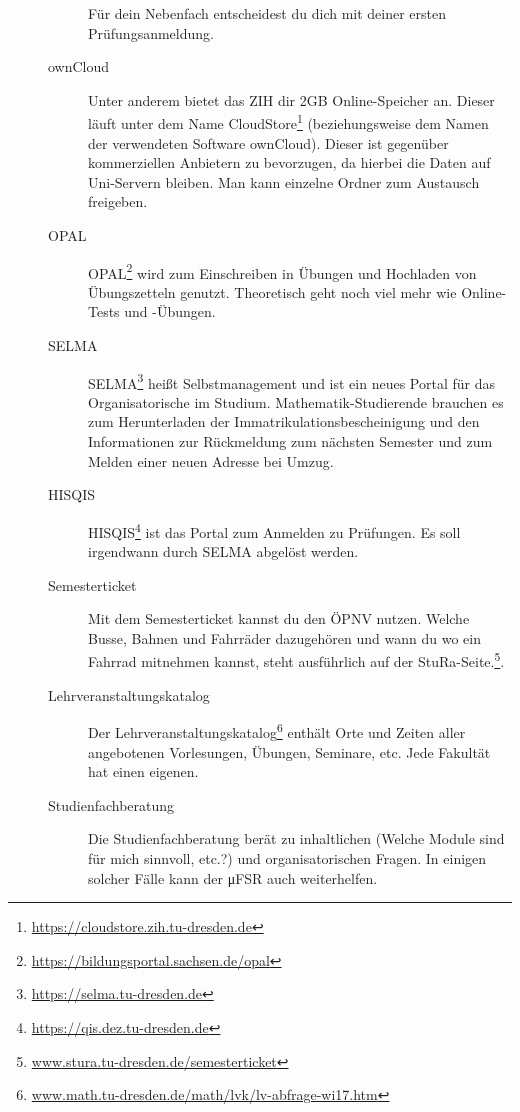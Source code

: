 \documentclass{scrartcl}
\begin{document}
\begin{description}
\begin{description}
    Für dein Nebenfach entscheidest du dich mit deiner ersten
    Prüfungsanmeldung.
  \item[ownCloud] Unter anderem bietet das ZIH dir 2GB Online-Speicher an.
    Dieser läuft unter dem Name CloudStore\footnote{\url{https://cloudstore.zih.tu-dresden.de}} (beziehungsweise dem Namen der verwendeten Software ownCloud).
    Dieser ist gegenüber kommerziellen Anbietern zu bevorzugen,
    da hierbei die Daten auf Uni-Servern bleiben. Man kann einzelne Ordner zum Austausch freigeben.
  \item[OPAL] OPAL\footnote{\url{https://bildungsportal.sachsen.de/opal}} wird zum Einschreiben in Übungen und Hochladen von Übungszetteln genutzt. Theoretisch geht noch viel mehr
    wie Online-Tests und -Übungen.
  \item[SELMA] SELMA\footnote{\url{https://selma.tu-dresden.de}} heißt Selbstmanagement und ist ein neues Portal für das Organisatorische
    im Studium. Mathematik-Studierende brauchen es zum Herunterladen der Immatrikulationsbescheinigung
    und den Informationen zur Rückmeldung zum nächsten Semester und zum Melden einer neuen Adresse bei Umzug.
  \item[HISQIS] HISQIS\footnote{\url{https://qis.dez.tu-dresden.de}} ist das Portal zum Anmelden zu Prüfungen. Es soll irgendwann durch SELMA abgelöst werden.
  \item[Semesterticket] Mit dem Semesterticket kannst du den ÖPNV nutzen. Welche Busse, Bahnen und Fahrräder dazugehören und wann du wo ein Fahrrad mitnehmen kannst,
    steht ausführlich auf der StuRa-Seite.\footnote{\url{www.stura.tu-dresden.de/semesterticket}}.
  \item[Lehrveranstaltungskatalog] Der Lehrveranstaltungskatalog\footnote{\url{www.math.tu-dresden.de/math/lvk/lv-abfrage-wi17.htm}} enthält Orte und Zeiten aller angebotenen
    Vorlesungen, Übungen, Seminare, etc. Jede Fakultät hat einen eigenen.
  \item[Studienfachberatung] Die Studienfachberatung berät zu
    inhaltlichen (Welche Module sind für mich sinnvoll, etc.?)
    und organisatorischen Fragen.
    In einigen solcher Fälle kann der μFSR auch weiterhelfen.


\end{description}
\end{description}
\end{document}
